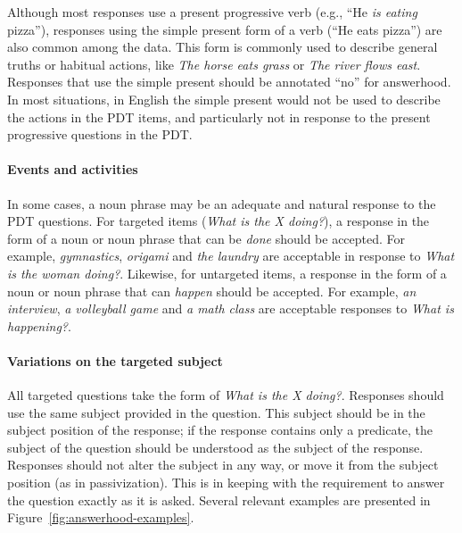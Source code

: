 \documentclass[12pt,notitlepage]{article}
\begin{document}
Although most responses use a present progressive  verb (e.g., ``He \textit{is eating} pizza''), responses using the simple present form of a verb (``He eats pizza'') are also common among the data. This form is commonly used to describe general truths or habitual actions, like \textit{The horse eats grass} or \textit{The river flows east}. Responses that use the simple present should be annotated ``no'' for answerhood. In most situations, in English the simple present would not be used to describe the actions in the PDT items, and particularly not in response to the present progressive questions in the PDT. 

\paragraph{Events and activities}
\label{para:answerhood-events}
In some cases, a noun phrase may be an adequate and natural response to the PDT questions. For targeted items (\textit{What is the X doing?}), a response in the form of a noun or noun phrase that can be \textit{done} should be accepted. For example, \textit{gymnastics}, \textit{origami} and \textit{the laundry} are acceptable in response to \textit{What is the woman doing?}. Likewise, for untargeted items, a response in the form of a noun or noun phrase that can \textit{happen} should be accepted. For example, \textit{an interview}, \textit{a volleyball game} and \textit{a math class} are acceptable responses to \textit{What is happening?}.

\paragraph{Variations on the targeted subject}
All targeted questions take the form of \textit{What is the X doing?}. Responses should use the same subject provided in the question. This subject should be in the subject position of the response; if the response contains only a predicate, the subject of the question should be understood as the subject of the response. Responses should not alter the subject in any way, or move it from the subject position (as in passivization). This is in keeping with the requirement to answer the question exactly as it is asked. Several relevant examples are presented in Figure~\ref{fig:answerhood-examples}.
\end{document}
